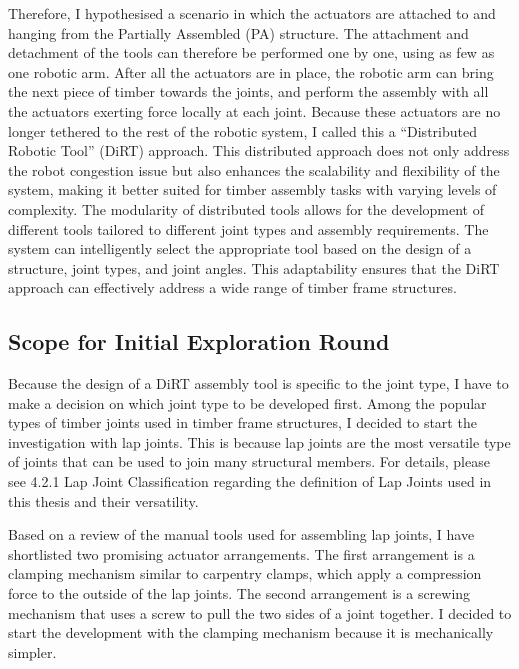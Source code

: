 Therefore, I hypothesised a scenario in which the actuators are attached to and hanging from the Partially Assembled (PA) structure. The attachment and detachment of the tools can therefore be performed one by one, using as few as one robotic arm. After all the actuators are in place, the robotic arm can bring the next piece of timber towards the joints, and perform the assembly with all the actuators exerting force locally at each joint. Because these actuators are no longer tethered to the rest of the robotic system, I called this a “Distributed Robotic Tool” (DiRT) approach. 
This distributed approach does not only address the robot congestion issue but also enhances the scalability and flexibility of the system, making it better suited for timber assembly tasks with varying levels of complexity. The modularity of distributed tools allows for the development of different tools tailored to different joint types and assembly requirements. The system can intelligently select the appropriate tool based on the design of a structure, joint types, and joint angles. This adaptability ensures that the DiRT approach can effectively address a wide range of timber frame structures.

\subsection{Scope for Initial Exploration Round}
\label{subsection:exploration_1_scope_for_initial_exploration_round}

Because the design of a DiRT assembly tool is specific to the joint type, I have to make a decision on which joint type to be developed first. Among the popular types of timber joints used in timber frame structures, I decided to start the investigation with lap joints. This is because lap joints are the most versatile type of joints that can be used to join many structural members. For details, please see 4.2.1 Lap Joint Classification regarding the definition of Lap Joints used in this thesis and their versatility.

Based on a review of the manual tools used for assembling lap joints, I have shortlisted two promising actuator arrangements. The first arrangement is a clamping mechanism similar to carpentry clamps, which apply a compression force to the outside of the lap joints. The second arrangement is a screwing mechanism that uses a screw to pull the two sides of a joint together. I decided to start the development with the clamping mechanism because it is mechanically simpler. 

